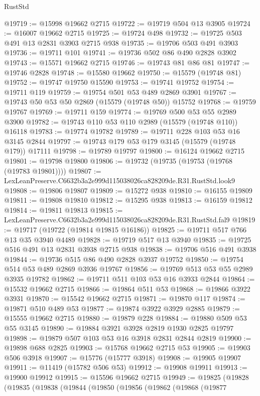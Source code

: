 \begin{lexlean}{RustStd}
\begin{coremodule}
@19719 := @15998 @19662 @2715
@19722 := @19719 @504 @13 @3905
@19724 := @16007 @19662 @2715
@19725 := @19724 @498
@19732 := @19725 @503 @491 @13 @2831 @3903 @2715 @938
@19735 := @19706 @503 @491 @3903
@19736 := @19711 @101
@19741 := @19736 @502 @86 @490 @2828 @3902
@19743 := @15571 @19662 @2715
@19746 := @19743 @81 @86 @81
@19747 := @19746 @2828
@19748 := @15580 @19662
@19750 := @15579 (@19748 @81)
@19752 := @19747 @19750 @15590
@19753 := @19741 @19752
@19754 := @19711 @119
@19759 := @19754 @501 @53 @489 @2869 @3901
@19767 := @19743 @50 @53 @50 @2869 (@15579 (@19748 @50)) @15752
@19768 := @19759 @19767
@19769 := @19711 @159
@19774 := @19769 @500 @53 @55 @2989 @3900
@19782 := @19743 @110 @53 @110 @2989 (@15579 (@19748 @110)) @16118
@19783 := @19774 @19782
@19789 := @19711 @228 @103 @53 @16 @3145 @2844
@19797 := @19743 @179 @53 @179 @3145 (@15579 (@19748 @179)) @17111
@19798 := @19789 @19797
@19800 := @16124 @19662 @2715
@19801 := @19798 @19800
@19806 := @19732 (@19735 (@19753 (@19768 (@19783 @19801))))
@19807 := LexLeanPreserve.C6632b3a2e999d115038026ca828209de.R31.RustStd.look9
@19808 := @19806 @19807
@19809 := @15272 @938
@19810 := @16155 @19809
@19811 := @19808 @19810
@19812 := @15295 @938
@19813 := @16159 @19812
@19814 := @19811 @19813
@19815 := LexLeanPreserve.C6632b3a2e999d115038026ca828209de.R31.RustStd.fal9
@19819 := @19717 (@19722 (@19814 @19815 @16186))
@19825 := @19711 @517 @766 @13 @35 @3940 @4489
@19828 := @19719 @517 @13 @3940
@19835 := @19725 @516 @491 @13 @2831 @3938 @2715 @938
@19838 := @19706 @516 @491 @3938
@19844 := @19736 @515 @86 @490 @2828 @3937 @19752
@19850 := @19754 @514 @53 @489 @2869 @3936 @19767
@19856 := @19769 @513 @53 @55 @2989 @3935 @19782
@19862 := @19711 @511 @103 @53 @16 @3933 @2844
@19864 := @15532 @19662 @2715
@19866 := @19864 @511 @53
@19868 := @19866 @3922 @3931
@19870 := @15542 @19662 @2715
@19871 := @19870 @117
@19874 := @19871 @510 @489 @53
@19877 := @19874 @3922 @3929 @2885
@19879 := @15555 @19662 @2715
@19880 := @19879 @228
@19884 := @19880 @509 @53 @55 @3145
@19890 := @19884 @3921 @3928 @2819 @1930 @2825 @19797
@19898 := @19879 @507 @103 @53 @16 @3918 @2831 @2844 @2819
@19900 := @19898 @688 @2825
@19903 := @15768 @19662 @2715 @53
@19905 := @19903 @506 @3918
@19907 := @15776 (@15777 @3918)
@19908 := @19905 @19907
@19911 := @11419 (@15782 @506 @53)
@19912 := @19908 @19911
@19913 := @19900 @19912
@19915 := @15596 @19662 @2715
@19949 := @19825
    (@19828
      (@19835
        (@19838
          (@19844
            (@19850
              (@19856
                (@19862
                  (@19868
                    (@19877

\end{coremodule}
\end{lexlean}
